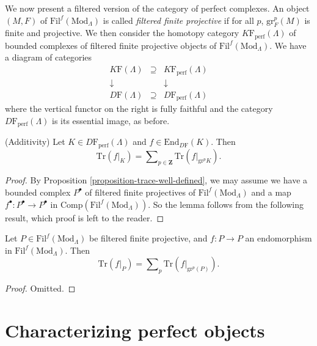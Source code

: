 \noindent
We now present a filtered version of the category of perfect complexes. An
object $(M,F)$ of $\text{Fil}^f(\text{Mod}_\Lambda)$ is called {\it filtered
finite projective} if for all $p$, $\text{gr}^p_F (M)$ is finite and
projective. We then consider the homotopy category
$K\mathrm{F}_{\text{perf}}(\Lambda)$ of bounded complexes of filtered finite
projective objects of $\text{Fil}^f(\text{Mod}_\Lambda)$. We have a diagram of
categories
$$
\begin{matrix}
K\mathrm{F}(\Lambda) & \supseteq & K\mathrm{F}_{\text{perf}}(\Lambda)\\
\downarrow & & \downarrow\\
D\mathrm{F}(\Lambda) & \supseteq & D\mathrm{F}_{\text{perf}}(\Lambda)
\end{matrix}
$$
where the vertical functor on the right is fully faithful and the category
$D\mathrm{F}_{\text{perf}}(\Lambda)$ is its essential image, as before.

\begin{lemma}
\label{lemma-additivity}
(Additivity)
Let $K\in D\mathrm{F}_{\text{perf}}(\Lambda)$ and $f\in
\text{End}_{D\mathrm{F}}(K)$. Then
$$
\text{Tr}(f|_K) =
\sum\nolimits_{p\in \mathbf{Z}} \text{Tr}(f|_{\text{gr}^p K}).
$$
\end{lemma}

\begin{proof}
By Proposition \ref{proposition-trace-well-defined}, we may assume we have
a bounded
complex $P^\bullet$ of filtered finite projectives of
$\text{Fil}^f(\text{Mod}_\Lambda)$ and a map $f^\bullet: P^\bullet\to
P^\bullet$ in $\text{Comp}(\text{Fil}^f(\text{Mod}_\Lambda))$. So the lemma
follows from the following result, which proof is left to the reader.
\end{proof}

\begin{lemma}
\label{lemma-additive-filtered-finite-projective}
Let $P \in \text{Fil}^f(\text{Mod}_\Lambda)$ be filtered finite projective, and
$f: P \to P$ an endomorphism in $\text{Fil}^f(\text{Mod}_\Lambda)$. Then
$$
\text{Tr}(f|_P) =
\sum\nolimits_p \text{Tr}(f|_{\text{gr}^p(P)}).
$$
\end{lemma}

\begin{proof}
Omitted.
\end{proof}







\section{Characterizing perfect objects}
\label{section-characterizing-perfect}

